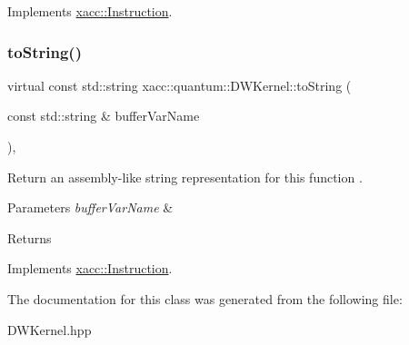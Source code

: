 Implements \hyperlink{a01155_a407a0ac662fa0b1ec3e301e8ff9bade7}{xacc\+::\+Instruction}.

\mbox{\label{a00983_adbc3fdd080ebba20bc620b8832979f16}} 
\subsubsection{\texorpdfstring{to\+String()}{toString()}}
{\footnotesize\ttfamily virtual const std\+::string xacc\+::quantum\+::\+D\+W\+Kernel\+::to\+String (\begin{DoxyParamCaption}\item[{const std\+::string \&}]{buffer\+Var\+Name }\end{DoxyParamCaption})\hspace{0.3cm}{\ttfamily [inline]}, {\ttfamily [virtual]}}

Return an assembly-\/like string representation for this function . 
\begin{DoxyParams}{Parameters}
{\em buffer\+Var\+Name} & \\
\hline
\end{DoxyParams}
\begin{DoxyReturn}{Returns}

\end{DoxyReturn}


Implements \hyperlink{a01155_ae94c2d089908294c1d410b14c96817ae}{xacc\+::\+Instruction}.



The documentation for this class was generated from the following file\+:\begin{DoxyCompactItemize}
\item 
D\+W\+Kernel.\+hpp\end{DoxyCompactItemize}
